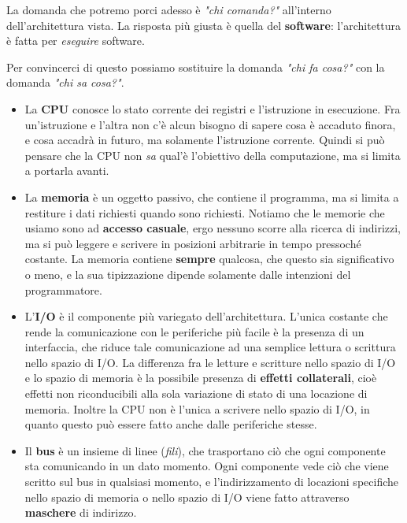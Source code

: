 \documentclass[a4paper,11pt]{article}
\begin{document}
La domanda che potremo porci adesso è \textit{"chi comanda?"} all'interno dell'architettura vista.
La risposta più giusta è quella del \textbf{software}: l'architettura è fatta per \textit{eseguire} software.

Per convincerci di questo possiamo sostituire la domanda \textit{"chi fa cosa?"} con la domanda \textit{"chi sa cosa?"}.

\begin{itemize}
	\item 
La \textbf{CPU} conosce lo stato corrente dei registri e l'istruzione in esecuzione.
Fra un'istruzione e l'altra non c'è alcun bisogno di sapere cosa è accaduto finora, e cosa accadrà in futuro, ma solamente l'istruzione corrente.
Quindi si può pensare che la CPU non \textit{sa} qual'è l'obiettivo della computazione, ma si limita a portarla avanti.

	\item
La \textbf{memoria} è un oggetto passivo, che contiene il programma, ma si limita a restiture i dati richiesti quando sono richiesti.
Notiamo che le memorie che usiamo sono ad \textbf{accesso casuale}, ergo nessuno scorre alla ricerca di indirizzi, ma si può leggere e scrivere in posizioni arbitrarie in tempo pressoché costante.
La memoria contiene \textbf{sempre} qualcosa, che questo sia significativo o meno, e la sua tipizzazione dipende solamente dalle intenzioni del programmatore.
	
	\item
L'\textbf{I/O} è il componente più variegato dell'architettura.
L'unica costante che rende la comunicazione con le periferiche più facile è la presenza di un interfaccia, che riduce tale comunicazione ad una semplice lettura o scrittura nello spazio di I/O.
La differenza fra le letture e scritture nello spazio di I/O e lo spazio di memoria è la possibile presenza di \textbf{effetti collaterali}, cioè effetti non riconducibili alla sola variazione di stato di una locazione di memoria.
Inoltre la CPU non è l'unica a scrivere nello spazio di I/O, in quanto questo può essere fatto anche dalle periferiche stesse.

	\item
Il \textbf{bus} è un insieme di linee (\textit{fili}), che trasportano ciò che ogni componente sta comunicando in un dato momento.
Ogni componente vede ciò che viene scritto sul bus in qualsiasi momento, e l'indirizzamento di locazioni specifiche nello spazio di memoria o nello spazio di I/O viene fatto attraverso \textbf{maschere} di indirizzo. 
\end{itemize}
\end{document}
